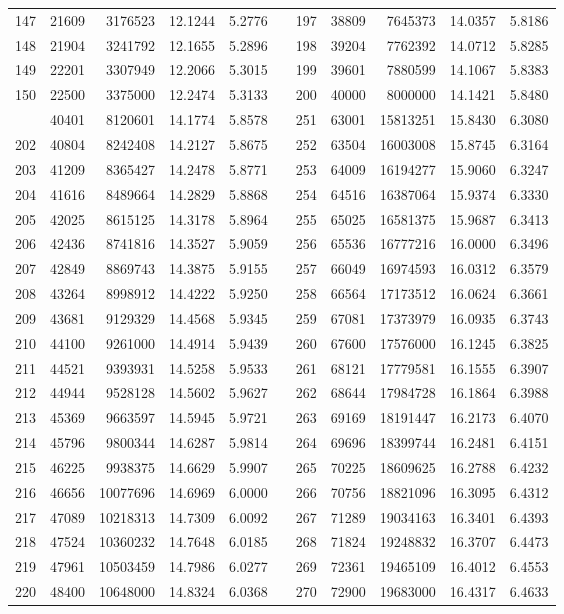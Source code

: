\begin{longtable}{rrrrrrrrrrr}
147&21609&3176523&12.1244&5.2776&&197&38809&7645373&14.0357&5.8186\\
148&21904&3241792&12.1655&5.2896&&198&39204&7762392&14.0712&5.8285\\
149&22201&3307949&12.2066&5.3015&&199&39601&7880599&14.1067&5.8383\\
150&22500&3375000&12.2474&5.3133&&200&40000&8000000&14.1421&5.8480\\
\newpage
201&40401&8120601&14.1774&5.8578&&251&63001&15813251&15.8430&6.3080\\
202&40804&8242408&14.2127&5.8675&&252&63504&16003008&15.8745&6.3164\\
203&41209&8365427&14.2478&5.8771&&253&64009&16194277&15.9060&6.3247\\
204&41616&8489664&14.2829&5.8868&&254&64516&16387064&15.9374&6.3330\\
205&42025&8615125&14.3178&5.8964&&255&65025&16581375&15.9687&6.3413\\
206&42436&8741816&14.3527&5.9059&&256&65536&16777216&16.0000&6.3496\\
207&42849&8869743&14.3875&5.9155&&257&66049&16974593&16.0312&6.3579\\
208&43264&8998912&14.4222&5.9250&&258&66564&17173512&16.0624&6.3661\\
209&43681&9129329&14.4568&5.9345&&259&67081&17373979&16.0935&6.3743\\
210&44100&9261000&14.4914&5.9439&&260&67600&17576000&16.1245&6.3825\\
211&44521&9393931&14.5258&5.9533&&261&68121&17779581&16.1555&6.3907\\
212&44944&9528128&14.5602&5.9627&&262&68644&17984728&16.1864&6.3988\\
213&45369&9663597&14.5945&5.9721&&263&69169&18191447&16.2173&6.4070\\
214&45796&9800344&14.6287&5.9814&&264&69696&18399744&16.2481&6.4151\\
215&46225&9938375&14.6629&5.9907&&265&70225&18609625&16.2788&6.4232\\
216&46656&10077696&14.6969&6.0000&&266&70756&18821096&16.3095&6.4312\\
217&47089&10218313&14.7309&6.0092&&267&71289&19034163&16.3401&6.4393\\
218&47524&10360232&14.7648&6.0185&&268&71824&19248832&16.3707&6.4473\\
219&47961&10503459&14.7986&6.0277&&269&72361&19465109&16.4012&6.4553\\
220&48400&10648000&14.8324&6.0368&&270&72900&19683000&16.4317&6.4633\\

\end{longtable}

